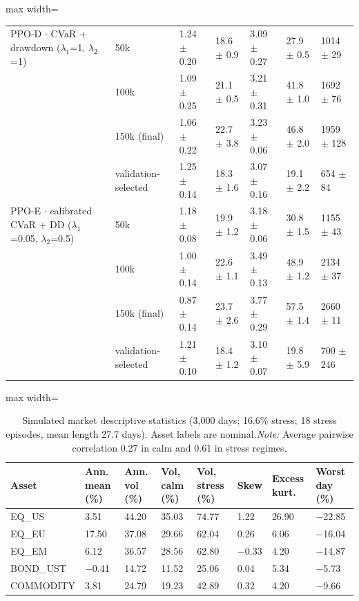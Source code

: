 \documentclass[11pt]{article}
\begin{document}
\begin{table}[!htbp]
\begin{adjustbox}{max width=\linewidth}
\begin{tabular}{@{}lllllll@{}}
PPO-D $\cdot$ CVaR + drawdown {($\lambda_1$=1, $\lambda_2$=1)} & 50k & 1.24{ $\pm$ 0.20} & 18.6{ $\pm$ 0.9} & 3.09{ $\pm$ 0.27} & 27.9{ $\pm$ 0.5} & 1014{ $\pm$ 29} \\
& 100k & 1.09{ $\pm$ 0.25} & 21.1{ $\pm$ 0.5} & 3.21{ $\pm$ 0.31} & 41.8{ $\pm$ 1.0} & 1692{ $\pm$ 76} \\
& 150k (final) & 1.06{ $\pm$ 0.22} & 22.7{ $\pm$ 3.8} & 3.23{ $\pm$ 0.06} & 46.8{ $\pm$ 2.0} & 1959{ $\pm$ 128} \\
& validation-selected & 1.25{ $\pm$ 0.14} & 18.3{ $\pm$ 1.6} & 3.07{ $\pm$ 0.16} & 19.1{ $\pm$ 2.2} & 654{ $\pm$ 84} \\
PPO-E $\cdot$ calibrated CVaR + DD {($\lambda_1$=0.05, $\lambda_2$=0.5)} & 50k & 1.18{ $\pm$ 0.08} & 19.9{ $\pm$ 1.2} & 3.18{ $\pm$ 0.06} & 30.8{ $\pm$ 1.5} & 1155{ $\pm$ 43} \\
& 100k & 1.00{ $\pm$ 0.14} & 22.6{ $\pm$ 1.1} & 3.49{ $\pm$ 0.13} & 48.9{ $\pm$ 1.2} & 2134{ $\pm$ 37} \\
& 150k (final) & 0.87{ $\pm$ 0.14} & 23.7{ $\pm$ 2.6} & 3.77{ $\pm$ 0.29} & 57.5{ $\pm$ 1.4} & 2660{ $\pm$ 11} \\
& validation-selected & 1.21{ $\pm$ 0.10} & 18.4{ $\pm$ 1.2} & 3.10{ $\pm$ 0.07} & 19.8{ $\pm$ 5.9} & 700{ $\pm$ 246} \\
\bottomrule
\end{tabular}
\end{adjustbox}
\end{table}

\begin{table}[!htbp]
\centering\scriptsize
\caption{Simulated market descriptive statistics (3,000 days; 16.6\% stress; 18 stress episodes, mean length 27.7 days). Asset labels are nominal.\label{tab-syn-data} \emph{Note:} Average pairwise correlation 0.27 in calm and 0.61 in stress regimes.}
\begin{adjustbox}{max width=\linewidth}
\begin{tabular}{@{}llllllll@{}}
\toprule
Asset & Ann. mean (\%) & Ann. vol (\%) & Vol, calm (\%) & Vol, stress (\%) & Skew & Excess kurt. & Worst day (\%) \\
\midrule
EQ\_US & 3.51 & 44.20 & 35.03 & 74.77 & 1.22 & 26.90 & $-$22.85 \\
EQ\_EU & 17.50 & 37.08 & 29.66 & 62.04 & 0.26 & 6.06 & $-$16.04 \\
EQ\_EM & 6.12 & 36.57 & 28.56 & 62.80 & $-$0.33 & 4.20 & $-$14.87 \\
BOND\_UST & $-$0.41 & 14.72 & 11.52 & 25.06 & 0.04 & 5.34 & $-$5.73 \\
COMMODITY & 3.81 & 24.79 & 19.23 & 42.89 & 0.32 & 4.20 & $-$9.66 \\
\bottomrule
\end{tabular}
\end{adjustbox}
\end{table}
\end{document}
